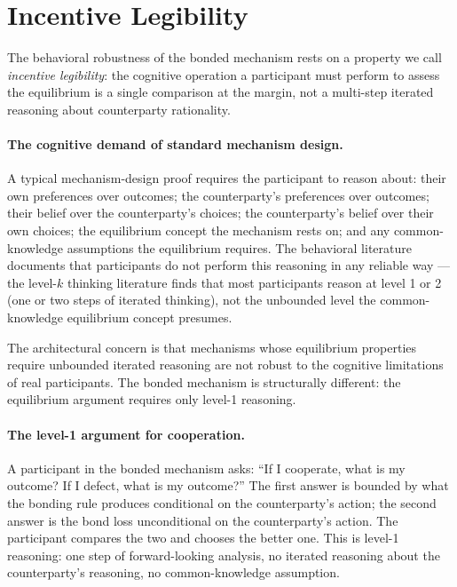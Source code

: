 \documentclass[11pt,a4paper]{article}
\theoremstyle{definition}
\theoremstyle{remark}
\begin{document}
\section{Incentive Legibility}
\label{sec:legibility}

The behavioral robustness of the bonded mechanism rests on a
property we call \emph{incentive legibility}: the cognitive
operation a participant must perform to assess the equilibrium
is a single comparison at the margin, not a multi-step iterated
reasoning about counterparty rationality.

\paragraph{The cognitive demand of standard mechanism design.}
A typical mechanism-design proof requires the participant to
reason about: their own preferences over outcomes; the
counterparty's preferences over outcomes; their belief over the
counterparty's choices; the counterparty's belief over their own
choices; the equilibrium concept the mechanism rests on; and any
common-knowledge assumptions the equilibrium requires. The
behavioral literature documents that participants do not perform
this reasoning in any reliable way --- the level-$k$ thinking
literature \citep{stahl_wilson_1995, costa-gomes_etal_2001} finds
that most participants reason at level 1 or 2 (one or two steps
of iterated thinking), not the unbounded level the
common-knowledge equilibrium concept presumes.

The architectural concern is that mechanisms whose equilibrium
properties require unbounded iterated reasoning are not robust to
the cognitive limitations of real participants. The bonded
mechanism is structurally different: the equilibrium argument
requires only level-1 reasoning.

\paragraph{The level-1 argument for cooperation.}
A participant in the bonded mechanism asks: ``If I cooperate, what
is my outcome? If I defect, what is my outcome?'' The first answer
is bounded by what the bonding rule produces conditional on the
counterparty's action; the second answer is the bond loss
unconditional on the counterparty's action. The participant
compares the two and chooses the better one. This is level-1
reasoning: one step of forward-looking analysis, no iterated
reasoning about the counterparty's reasoning, no common-knowledge
assumption.
\end{document}

